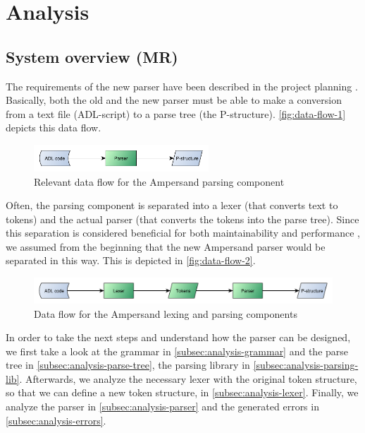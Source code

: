 
\section{Analysis}
\label{sec:analysis}

\subsection{System overview (MR)}
The requirements of the new parser have been described in the project planning .
Basically, both the old and the new parser must be able to make a conversion from a text file (ADL-script) to a parse tree (the P-structure).
\autoref{fig:data-flow-1} depicts this data flow.
%
\begin{figure}[htb!]
	\centering
	\includegraphics[width=0.586\textwidth]{Figures/DataFlow1}
	\caption{Relevant data flow for the Ampersand parsing component}
	\label{fig:data-flow-1}
\end{figure}

Often, the parsing component is separated into a lexer (that converts text to tokens) and the actual parser (that converts the tokens into the parse tree).
Since this separation is considered beneficial for both maintainability and performance , we assumed from the beginning that the new Ampersand parser would be separated in this way.
This is depicted in \autoref{fig:data-flow-2}.
%
\begin{figure}[htb!]
	\centering
	\includegraphics[width=1\textwidth]{Figures/DataFlow2}
	\caption{Data flow for the Ampersand lexing and parsing components}
	\label{fig:data-flow-2}
\end{figure}

In order to take the next steps and understand how the parser can be designed, we first take a look at the grammar in \autoref{subsec:analysis-grammar} and the parse tree in \autoref{subsec:analysis-parse-tree}, the parsing library in \autoref{subsec:analysis-parsing-lib}.
Afterwards, we analyze the necessary lexer with the original token structure, so that we can define a new token structure, in \autoref{subsec:analysis-lexer}.
Finally, we analyze the parser in \autoref{subsec:analysis-parser} and the generated errors in \autoref{subsec:analysis-errors}.

